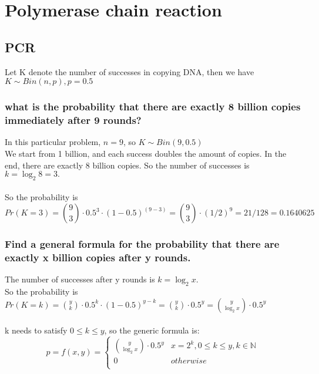 \documentclass{article}
\date{February 2018}
\begin{document}
\section{Polymerase chain reaction}

\subsection{PCR}
Let K denote the number of successes in copying DNA, then we have \( K \sim Bin(n, p), p = 0.5\)

\subsubsection{what is the probability that there are exactly 8 billion copies immediately after 9 rounds?}

In this particular problem, \( n = 9 \), so \( K \sim Bin(9, 0.5)\)\\
We start from 1 billion, and each success doubles the amount of copies. In the end, there are exactly 8 billion copies. So the number of successes is \( k = {\log_2 8} = 3. \) \\
\\
So the probability is \\
\[
Pr(K = 3) = {9 \choose 3} \cdot 0.5^3 \cdot (1 - 0.5)^{(9-3)} = {9 \choose 3} \cdot (1/2)^9 = 21/128 = 0.1640625
\]

\subsubsection{Find a general formula for the probability that there are exactly x billion copies after y rounds.}

The number of successes after y rounds is \( k = {\log_2 x} \). \\
So the probability is \( Pr(K = k) = {y \choose k} \cdot 0.5^k \cdot (1 - 0.5)^{y-k} = {y \choose k} \cdot 0.5^y = 
{y \choose {\log_2 x}} \cdot 0.5^y\) \\
\\
k needs to satisfy \( 0 \leq k \leq y\), so the generic formula is: \\
\[
p = f(x,y) = \left\{
\begin{array}{ll}
      {y \choose {\log_2 x}} \cdot 0.5^y & x = 2^k, 0\leq k \leq y, k \in \mathbb{N} \\
      0 & otherwise\\
\end{array} 
\right.
\]
\end{document}
